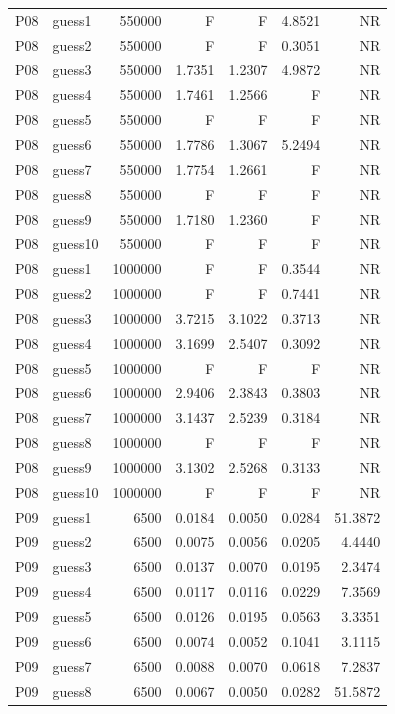 {\begin{longtable}{llrrrrr}
P08 & guess1 & 550000 & F & F & 4.8521 & NR \\
P08 & guess2 & 550000 & F & F & 0.3051 & NR \\
P08 & guess3 & 550000 & 1.7351 & 1.2307 & 4.9872 & NR \\
P08 & guess4 & 550000 & 1.7461 & 1.2566 & F & NR \\
P08 & guess5 & 550000 & F & F & F & NR \\
P08 & guess6 & 550000 & 1.7786 & 1.3067 & 5.2494 & NR \\
P08 & guess7 & 550000 & 1.7754 & 1.2661 & F & NR \\
P08 & guess8 & 550000 & F & F & F & NR \\
P08 & guess9 & 550000 & 1.7180 & 1.2360 & F & NR \\
P08 & guess10 & 550000 & F & F & F & NR \\
P08 & guess1 & 1000000 & F & F & 0.3544 & NR \\
P08 & guess2 & 1000000 & F & F & 0.7441 & NR \\
P08 & guess3 & 1000000 & 3.7215 & 3.1022 & 0.3713 & NR \\
P08 & guess4 & 1000000 & 3.1699 & 2.5407 & 0.3092 & NR \\
P08 & guess5 & 1000000 & F & F & F & NR \\
P08 & guess6 & 1000000 & 2.9406 & 2.3843 & 0.3803 & NR \\
P08 & guess7 & 1000000 & 3.1437 & 2.5239 & 0.3184 & NR \\
P08 & guess8 & 1000000 & F & F & F & NR \\
P08 & guess9 & 1000000 & 3.1302 & 2.5268 & 0.3133 & NR \\
P08 & guess10 & 1000000 & F & F & F & NR \\
P09 & guess1 & 6500 & 0.0184 & 0.0050 & 0.0284 & 51.3872 \\
P09 & guess2 & 6500 & 0.0075 & 0.0056 & 0.0205 & 4.4440 \\
P09 & guess3 & 6500 & 0.0137 & 0.0070 & 0.0195 & 2.3474 \\
P09 & guess4 & 6500 & 0.0117 & 0.0116 & 0.0229 & 7.3569 \\
P09 & guess5 & 6500 & 0.0126 & 0.0195 & 0.0563 & 3.3351 \\
P09 & guess6 & 6500 & 0.0074 & 0.0052 & 0.1041 & 3.1115 \\
P09 & guess7 & 6500 & 0.0088 & 0.0070 & 0.0618 & 7.2837 \\
P09 & guess8 & 6500 & 0.0067 & 0.0050 & 0.0282 & 51.5872 \\

\end{longtable}}
